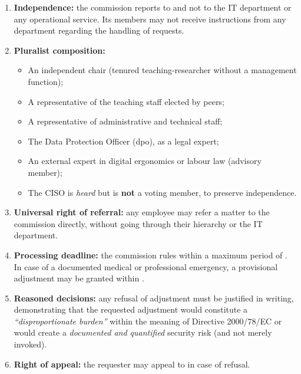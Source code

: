 \begin{enumerate}
    \item \textbf{Independence:} the commission reports to 
    and not to the IT department or any operational service. Its members
    may not receive instructions from any department regarding the
    handling of requests.

    \item \textbf{Pluralist composition:}
    \begin{itemize}[nosep]
        \item An independent chair (tenured teaching-researcher
        without a management function);
        \item A representative of the teaching staff elected by peers;
        \item A representative of administrative and technical staff;
        \item The Data Protection Officer (\gls{dpo}), as a
        legal expert;
        \item An external expert in digital ergonomics or labour
        law (advisory member);
        \item The CISO is \emph{heard} but is \textbf{not}
        a voting member, to preserve independence.
    \end{itemize}

    \item \textbf{Universal right of referral:} any employee may refer
    a matter to the commission directly, without going through their
    hierarchy or the IT department.

    \item \textbf{Processing deadline:} the commission rules within a
    maximum period of . In case of a documented medical or
    professional emergency, a provisional adjustment may be
    granted within .

    \item \textbf{Reasoned decisions:} any refusal of adjustment
    must be justified in writing, demonstrating that the requested
    adjustment would constitute a \emph{``disproportionate burden''} within
    the meaning of Directive 2000/78/EC or would create a
    \emph{documented and quantified} security risk (and not merely invoked).

    \item \textbf{Right of appeal:} the requester may appeal
    to  in case of refusal.


\end{enumerate}
